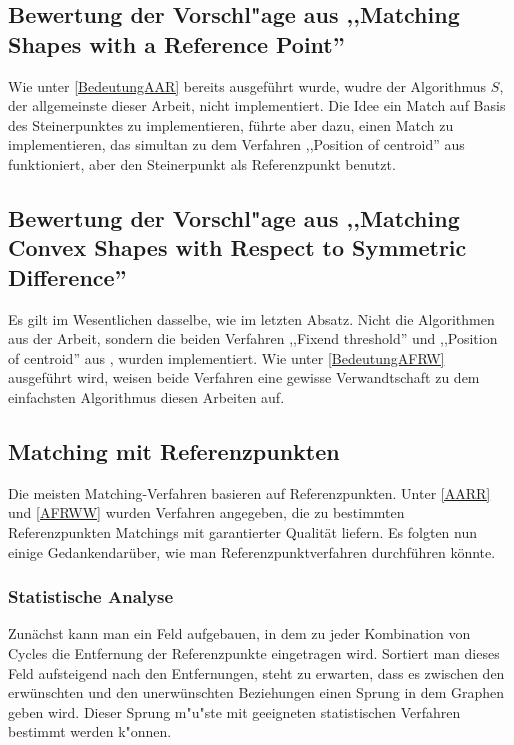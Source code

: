 \subsection[Bewertung der Vorschl"age aus \cite{AAR}]{Bewertung der Vorschl"age aus ,,Matching Shapes with a Reference Point'' \cite{AAR}}

Wie unter \vref{BedeutungAAR} bereits ausgeführt wurde, wudre der Algorithmus $S$, der allgemeinste dieser Arbeit, nicht implementiert. Die Idee ein Match auf Basis des Steinerpunktes zu implementieren, führte aber dazu, einen Match zu implementieren, das simultan zu dem Verfahren ,,Position of centroid'' aus \cite{TG} funktioniert, aber den Steinerpunkt als Referenzpunkt benutzt.

\subsection[Bewertung der Vorschl"age aus \cite{AFRW}]{Bewertung der Vorschl"age aus ,,Matching Convex Shapes with Respect to Symmetric Difference'' \cite{AFRW}}

Es gilt im Wesentlichen dasselbe, wie  im letzten Absatz. Nicht die Algorithmen aus der Arbeit, sondern die beiden Verfahren ,,Fixend threshold'' und ,,Position of centroid'' aus \cite{TG}, wurden implementiert. Wie unter \vref{BedeutungAFRW} ausgeführt wird, weisen beide Verfahren  eine gewisse Verwandtschaft zu dem einfachsten Algorithmus diesen Arbeiten auf. 


\subsection{Matching mit Referenzpunkten}

Die meisten Matching-Verfahren basieren auf Referenzpunkten. Unter \vref{AARR} und \vref{AFRWW} wurden Verfahren angegeben, die zu bestimmten Referenzpunkten Matchings mit garantierter Qualität liefern. Es folgten nun einige Gedankendarüber, wie man Referenzpunktverfahren durchführen könnte.


\subsubsection*{Statistische Analyse}

Zunächst kann man ein Feld aufgebauen, in dem zu jeder Kombination von Cycles die Entfernung der Referenzpunkte eingetragen wird. Sortiert man dieses Feld aufsteigend nach den Entfernungen, steht zu erwarten, dass es zwischen den erwünschten und den unerwünschten Beziehungen einen Sprung in dem Graphen geben wird.  Dieser Sprung m"u"ste mit geeigneten statistischen Verfahren bestimmt werden k"onnen. 

